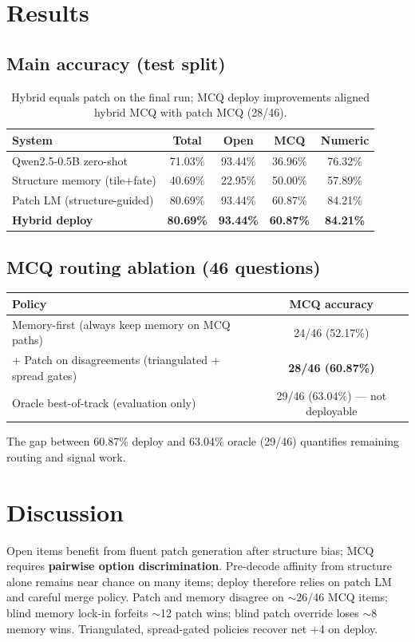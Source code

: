 \documentclass[11pt,a4paper]{article}
\begin{document}
\section{Results}

\subsection{Main accuracy (test split)}
\begin{table}[h]
\centering
\begin{tabular}{lcccc}
\toprule
System & Total & Open & MCQ & Numeric \\
\midrule
Qwen2.5-0.5B zero-shot & 71.03\% & 93.44\% & 36.96\% & 76.32\% \\
Structure memory (tile+fate) & 40.69\% & 22.95\% & 50.00\% & 57.89\% \\
Patch LM (structure-guided) & 80.69\% & 93.44\% & 60.87\% & 84.21\% \\
\textbf{Hybrid deploy} & \textbf{80.69\%} & \textbf{93.44\%} & \textbf{60.87\%} & \textbf{84.21\%} \\
\bottomrule
\end{tabular}
\caption{Hybrid equals patch on the final run; MCQ deploy improvements aligned hybrid MCQ with patch MCQ (28/46).}
\end{table}

\subsection{MCQ routing ablation (46 questions)}
\begin{table}[h]
\centering
\begin{tabular}{lc}
\toprule
Policy & MCQ accuracy \\
\midrule
Memory-first (always keep memory on MCQ paths) & 24/46 (52.17\%) \\
+ Patch on disagreements (triangulated + spread gates) & \textbf{28/46 (60.87\%)} \\
Oracle best-of-track (evaluation only) & 29/46 (63.04\%) --- not deployable \\
\bottomrule
\end{tabular}
\end{table}

The gap between 60.87\% deploy and 63.04\% oracle (29/46) quantifies remaining routing and signal work.

\section{Discussion}
Open items benefit from fluent patch generation after structure bias; MCQ requires \textbf{pairwise option discrimination}. Pre-decode affinity from structure alone remains near chance on many items; deploy therefore relies on patch LM and careful merge policy. Patch and memory disagree on $\sim$26/46 MCQ items; blind memory lock-in forfeits $\sim$12 patch wins; blind patch override loses $\sim$8 memory wins. Triangulated, spread-gated policies recover net +4 on deploy.
\end{document}
